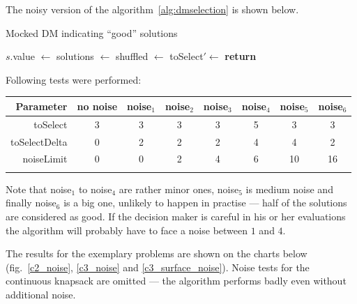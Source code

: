 The noisy version of the algorithm~\ref{alg:dmselection} is shown below.
\begin{algorithm}
\caption{Mocked DM indicating ``good'' solutions}\label{alg:noisydmselection}
  \begin{algorithmic}[1]
    \State $s.$value $\gets$ 
    \EndFor
    \State solutions $\gets$ 
    \State shuffled $\gets$ 
    \State toSelect$' \gets$ 
    \State \textbf{return} 
    \EndProcedure
  \end{algorithmic}
\end{algorithm}

Following tests were performed:

\begin{tabular}{r c c c c c c c}
  \hline
  Parameter & no noise & noise$_1$ & noise$_2$ & noise$_3$ & noise$_4$ &
  noise$_5$ & noise$_6$ \\
  \hline
  \hline
  toSelect      & 3 & 3 & 3 & 3 & 5 &  3 &  3 \\
  toSelectDelta & 0 & 2 & 2 & 2 & 4 &  4 &  2 \\
  noiseLimit    & 0 & 0 & 2 & 4 & 6 & 10 & 16 \\
  \hline \\
\end{tabular}

Note that noise$_1$ to noise$_4$ are rather minor ones, noise$_5$ is medium
noise and finally noise$_6$ is a big one, unlikely to happen in practise ---
half of the solutions are considered as good. If the decision maker is careful
in his or her evaluations the algorithm will probably have to face a noise
between $1$ and $4$.

The results for the exemplary problems are shown on the charts below
(fig.~\ref{c2_noise}, \ref{c3_noise} and \ref{c3_surface_noise}). Noise tests
for the continuous knapsack are omitted --- the algorithm performs badly even
without additional noise.

